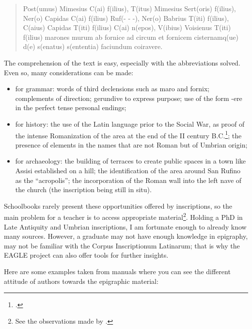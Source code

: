 \documentclass[amsthm,ebook]{saparticle}
\begin{document}
\begin{quotation}
Post(umus) Mimesius C(ai) f(ilius), T(itus) Mimesius Sert(oris) f(ilius), Ner(o) Capidas C(ai) f(ilius) Ruf(- - -),
Ner(o) Babrius T(iti) f(ilius), C(aius) Capidas T(iti) f(ilius) C(ai) n(epos), V(ibius) Voisienus T(iti) f(ilius)
marones murum ab fornice ad circum et fornicem cisternamq(ue) d(e) s(enatus) s(ententia) faciundum coiravere.

\end{quotation}
The comprehension of the text is easy, especially with the abbreviations solved. Even so, many considerations can be
made:

\begin{itemize}
\item for grammar: words of third declensions such as maro and fornix; complements of direction; gerundive to express
purpose; use of the form {}-ere in the perfect tense personal endings;
\item for history: the use of the Latin language prior to the Social War, as proof of the intense Romanization of the
area at the end of the II century B.C.\footnote{\citet{Coarelli1991}.}; the presence of elements in the names that are not
Roman but of Umbrian origin;
\item for archaeology: the building of terraces to create public spaces in a town like Assisi established on a hill; the
identification of the area around San Rufino as the ``acropolis''; the incorporation of the Roman wall into the left nave
of the church (the inscription being still in situ).
\end{itemize}



Schoolbooks rarely present these opportunities offered by inscriptions, so the main problem for a teacher is to access
appropriate material\footnote{ See the observations made by \citet{Carpenter2006}.}. Holding a PhD in Late Antiquity and
Umbrian inscriptions, I am fortunate enough to already know many sources. However, a graduate may not have enough
knowledge in epigraphy, may not be familiar with the Corpus Inscriptionum Latinarum; that is why the EAGLE project can
also offer tools for further insights.

Here are some examples taken from manuals where you can see the different attitude of authors towards the epigraphic
material:
\end{document}
